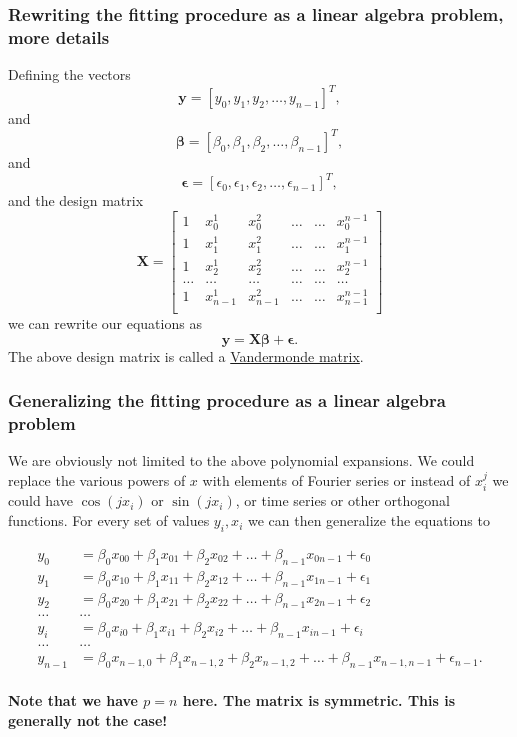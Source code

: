 \documentclass{beamer}
\begin{document}
\begin{frame}
\frametitle{Rewriting the fitting procedure as a linear algebra problem, more details}

\begin{block}{}
Defining the vectors
\[
\bm{y} = [y_0,y_1, y_2,\dots, y_{n-1}]^T,
\]
and
\[
\bm{\beta} = [\beta_0,\beta_1, \beta_2,\dots, \beta_{n-1}]^T,
\]
and
\[
\bm{\epsilon} = [\epsilon_0,\epsilon_1, \epsilon_2,\dots, \epsilon_{n-1}]^T,
\]
and the design matrix
\[
\bm{X}=
\begin{bmatrix} 
1& x_{0}^1 &x_{0}^2& \dots & \dots &x_{0}^{n-1}\\
1& x_{1}^1 &x_{1}^2& \dots & \dots &x_{1}^{n-1}\\
1& x_{2}^1 &x_{2}^2& \dots & \dots &x_{2}^{n-1}\\                      
\dots& \dots &\dots& \dots & \dots &\dots\\
1& x_{n-1}^1 &x_{n-1}^2& \dots & \dots &x_{n-1}^{n-1}\\
\end{bmatrix} 
\]
we can rewrite our equations as
\[
\bm{y} = \bm{X}\bm{\beta}+\bm{\epsilon}.
\]
The above design matrix is called a \href{{https://en.wikipedia.org/wiki/Vandermonde_matrix}}{Vandermonde matrix}.
\end{block}
\end{frame}

\begin{frame}
\frametitle{Generalizing the fitting procedure as a linear algebra problem}

\begin{block}{}

We are obviously not limited to the above polynomial expansions.  We
could replace the various powers of $x$ with elements of Fourier
series or instead of $x_i^j$ we could have $\cos{(j x_i)}$ or $\sin{(j
x_i)}$, or time series or other orthogonal functions.  For every set
of values $y_i,x_i$ we can then generalize the equations to

\begin{align*}
y_0&=\beta_0x_{00}+\beta_1x_{01}+\beta_2x_{02}+\dots+\beta_{n-1}x_{0n-1}+\epsilon_0\\
y_1&=\beta_0x_{10}+\beta_1x_{11}+\beta_2x_{12}+\dots+\beta_{n-1}x_{1n-1}+\epsilon_1\\
y_2&=\beta_0x_{20}+\beta_1x_{21}+\beta_2x_{22}+\dots+\beta_{n-1}x_{2n-1}+\epsilon_2\\
\dots & \dots \\
y_{i}&=\beta_0x_{i0}+\beta_1x_{i1}+\beta_2x_{i2}+\dots+\beta_{n-1}x_{in-1}+\epsilon_i\\
\dots & \dots \\
y_{n-1}&=\beta_0x_{n-1,0}+\beta_1x_{n-1,2}+\beta_2x_{n-1,2}+\dots+\beta_{n-1}x_{n-1,n-1}+\epsilon_{n-1}.\\
\end{align*}

\textbf{Note that we have $p=n$ here. The matrix is symmetric. This is generally not the case!}
\end{block}
\end{frame}
\end{document}
